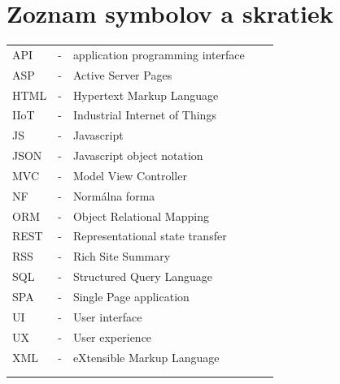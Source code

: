 \documentclass[11pt, oneside]{report}
\begin{document}


\newpage

\chapter*{ Zoznam symbolov a skratiek }
\begin{table}[H]
\label{my-label}
\begin{tabular}{lllll}
API  & - &  application programming interface &  &  \\
ASP&- &Active Server Pages  &  &  \\
HTML & - &  Hypertext Markup Language&  &  \\
IIoT   & - & Industrial Internet of Things  &  &  \\
JS   & - & Javascript  &  &  \\
JSON & - & Javascript object notation &  &  \\
MVC  & - &  Model View Controller &  &  \\
NF & - &  Normálna forma &  &  \\
ORM & - &  Object Relational Mapping &  &  \\
REST & - & Representational state transfer&  &  \\
RSS & - &  Rich Site Summary &  &  \\
SQL  & - &  Structured Query Language&  &  \\
SPA  & - &  Single Page application&  &  \\
UI  & - &  User interface &  &  \\
UX  & - &  User experience &  &  \\
XML  & - &  eXtensible Markup Language &  &  \\
 &  &  &  &  \\
 &  &  &  & 
\end{tabular}
\end{table}
\newpage 

\listoffigures

\newpage 

\listoftables
{}
\end{document}
